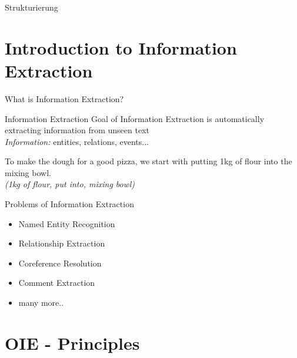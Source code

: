 \documentclass[11pt]{beamer}
\begin{document}
\begin{frame}{Strukturierung}
    \tableofcontents
\end{frame}

\section{Introduction to Information Extraction}
	\begin{frame}{What is Information Extraction?}
			\begin{center}
			\begin{block}{Information Extraction}
				Goal of Information Extraction is automatically extracting information from unseen text\\
				\textit{Information:} entities, relations, events...\\
				\end{block}
				\vspace{15pt}
				To make the dough for a good pizza, we start with putting 1kg of flour into the mixing bowl.\\
				\textit{(1kg of flour, put into, mixing bowl)}
			\end{center}
	\end{frame}
	\begin{frame}{Problems of Information Extraction}
				\begin{center}
				\begin{itemize}
					\item Named Entity Recognition
					\item Relationship Extraction 
					\item Coreference Resolution
					\item Comment Extraction
					\item many more..
					\end{itemize}
				\end{center}
	\end{frame}
\section{OIE - Principles}
\end{document}
